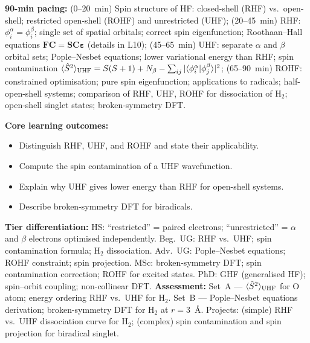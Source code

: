\documentclass[11pt,a4paper]{article}
\begin{document}
\begin{tcolorbox}[chembox, title={Module~III.2 / L06: Restricted and Unrestricted Methods}]
\textbf{90-min pacing:} (0--20~min) Spin structure of HF: closed-shell (RHF) vs.\ open-shell; restricted open-shell (ROHF) and unrestricted (UHF); (20--45~min) RHF: $\phi_i^\alpha=\phi_i^\beta$; single set of spatial orbitals; correct spin eigenfunction; Roothaan--Hall equations $\mathbf{F}\mathbf{C}=\mathbf{S}\mathbf{C}\boldsymbol\varepsilon$ (details in L10); (45--65~min) UHF: separate $\alpha$ and $\beta$ orbital sets; Pople--Nesbet equations; lower variational energy than RHF; spin contamination $\langle\hat{S}^2\rangle_{\rm UHF}=S(S+1)+N_\beta-\sum_{ij}|\langle\phi_i^\alpha|\phi_j^\beta\rangle|^2$; (65--90~min) ROHF: constrained optimisation; pure spin eigenfunction; applications to radicals; half-open-shell systems; comparison of RHF, UHF, ROHF for dissociation of H$_2$; open-shell singlet states; broken-symmetry DFT.

\medskip\textbf{Core learning outcomes:}
\begin{itemize}[leftmargin=1.4em,topsep=2pt,itemsep=1pt]
  \item Distinguish RHF, UHF, and ROHF and state their applicability.
  \item Compute the spin contamination of a UHF wavefunction.
  \item Explain why UHF gives lower energy than RHF for open-shell systems.
  \item Describe broken-symmetry DFT for biradicals.
\end{itemize}
\medskip\textbf{Tier differentiation:}
HS: ``restricted'' = paired electrons; ``unrestricted'' = $\alpha$ and $\beta$ electrons optimised independently.
Beg.\ UG: RHF vs.\ UHF; spin contamination formula; H$_2$ dissociation.
Adv.\ UG: Pople--Nesbet equations; ROHF constraint; spin projection.
MSc: broken-symmetry DFT; spin contamination correction; ROHF for excited states.
PhD: GHF (generalised HF); spin--orbit coupling; non-collinear DFT.
\medskip\textbf{Assessment:}
Set~A --- $\langle\hat{S}^2\rangle_{\rm UHF}$ for O atom; energy ordering RHF vs.\ UHF for H$_2$.
Set~B --- Pople--Nesbet equations derivation; broken-symmetry DFT for H$_2$ at $r=3$~\AA.
Projects: (simple) RHF vs.\ UHF dissociation curve for H$_2$; (complex) spin contamination and spin projection for biradical singlet.
\end{tcolorbox}

\medskip
\end{document}
